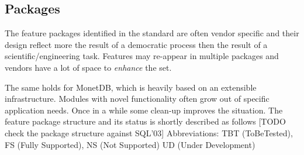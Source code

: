 \documentclass[10pt,twocolumn,fleqn]{article}
\begin{document}
\subsection*{Packages}
The feature packages identified in the standard are often vendor specific
and their design reflect more the result of a democratic process then
the result of a scientific/engineering task.
Features may re-appear in multiple packages and vendors have a lot of
space to {\em enhance} the set.

The same holds for MonetDB, which is heavily based on an extensible 
infrastructure. Modules with novel functionality often grow out of
specific application needs. Once in a while some clean-up improves
the situation.
The feature package structure and its status is shortly described as follows
[TODO check the package structure against SQL'03]
Abbreviations: TBT (ToBeTested), FS  (Fully Supported), NS (Not Supported)
UD (Under Development)
\end{document}
